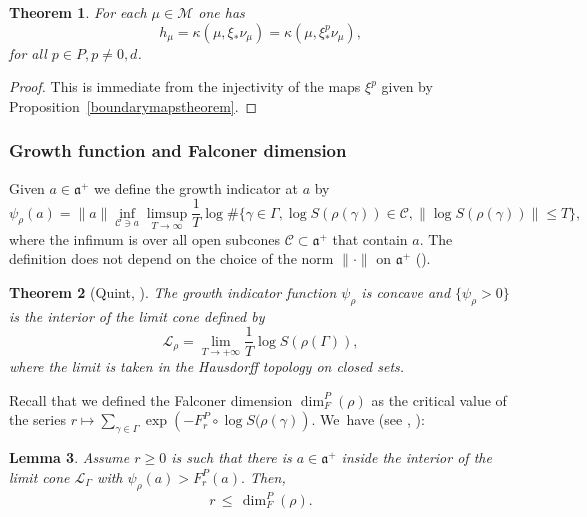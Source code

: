 \documentclass[JEP,XML,SOM,Unicode,NoEqCountersInSection,published]{cedram}
\newtheorem{theorem}{Theorem}[section]
\newtheorem{lemma}[theorem]{Lemma}
\newcommand{\CC}{\mathcal C}
\newcommand{\M}{\mathcal M}
\let\G\Gamma
\let\g\gamma
\newcommand{\aaa}{\mathfrak a}
\begin{document}

\begin{theorem}\label{entropytheorem}
For each \(\mu \in \M\) one has
\[
h_\mu = \kappa(\mu,\xi_*\nu_\mu) = \kappa(\mu,\xi^p_*\nu_\mu),
\]
for all \(p \in P, p\not = 0,d\).
\end{theorem}
\begin{proof}
This is immediate from the injectivity of the maps \(\xi^p\) given by Proposition~\ref{boundarymapstheorem}.
\end{proof}

\subsubsection{Growth function and Falconer dimension}

Given \(a \in \aaa^+\) we define the growth indicator at \(a\) by
\begin{equation}\label{growth}
\psi_\rho(a) = \| a\| \inf_{\CC \ni a}
\limsup_{T \to \infty } \frac{1}{T}\log \# \{ \g \in \G, \log S(\rho(\g)) \in \CC, \|\log S(\rho(\g)) \| \leq T\}, \end{equation}
where the infimum is over all open subcones \(\CC \subset \aaa^+\) that contain \(a\). The definition does not depend on the choice of the norm \(\|{\cdot}\| \) on \(\aaa^+\) (\cite{Qui02a}).

\begin{theorem}[Quint, \cite{Qui02a}]\label{cone}
The growth indicator function \(\psi_\rho\) is concave and \(\lbrace \psi_\rho > 0\rbrace\) is the interior of the limit cone defined by
\[
\mathcal{L}_\rho = \lim_{T \to +\infty}\frac{1}{T}\log S(\rho(\Gamma)),
\]
where the limit is taken in the Hausdorff topology on closed sets.
\end{theorem}

Recall that we defined the Falconer dimension \(\dim_F^P(\rho)\) as the critical value of the series
\(r \mapsto \sum_{\gamma \in \Gamma}\exp\left(-F^P_r\circ \log S(\rho(\gamma)\right)\). We~have (see \cite[Lem.\,4.2]{sambarino}, \cite[Lem.\,III.1.3]{Qui02a}):

\begin{lemma}\label{falconer2}
Assume \(r\ge 0 \) is such that there is \(a \in \aaa^+ \) inside the interior of the limit cone \(\mathcal{L}_\Gamma \) with \(\psi_\rho (a) > F^P_r (a). \) Then,
\[
 r \, \le \, \dim_F^P (\rho).
\]
\end{lemma}
\end{document}
